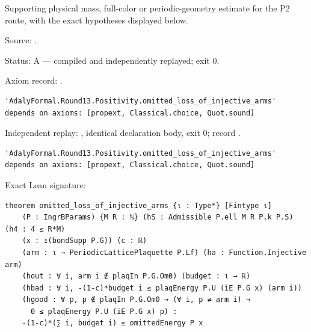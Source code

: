 \begin{theorem}[bp-469]
\label{bp-469}
\leanok
Supporting physical mass, full-color or periodic-geometry estimate for the P2 route, with the exact hypotheses displayed below.

\par Source: \texttt{}.
\par Status: A — compiled and independently replayed; exit 0.
\par Axiom record: \texttt{}.
\begin{verbatim}
'AdalyFormal.Round13.Positivity.omitted_loss_of_injective_arms' depends on axioms: [propext, Classical.choice, Quot.sound]
\end{verbatim}
\par Independent replay: \texttt{}, identical declaration body, exit 0; record \texttt{}.
\begin{verbatim}
'AdalyFormal.Round13.Positivity.omitted_loss_of_injective_arms' depends on axioms: [propext, Classical.choice, Quot.sound]
\end{verbatim}
\par Exact Lean signature:
\begin{verbatim}
theorem omitted_loss_of_injective_arms {ι : Type*} [Fintype ι]
    (P : IngrBParams) {M R : ℕ} (hS : Admissible P.ell M R P.k P.S) (h4 : 4 ≤ R*M)
    (x : ↥(bondSupp P.G)) (c : ℝ)
    (arm : ι → PeriodicLatticePlaquette P.Lf) (ha : Function.Injective arm)
    (hout : ∀ i, arm i ∉ plaqIn P.G.Om0) (budget : ι → ℝ)
    (hbad : ∀ i, -(1-c)*budget i ≤ plaqEnergy P.U (iE P.G x) (arm i))
    (hgood : ∀ p, p ∉ plaqIn P.G.Om0 → (∀ i, p ≠ arm i) →
      0 ≤ plaqEnergy P.U (iE P.G x) p) :
    -(1-c)*(∑ i, budget i) ≤ omittedEnergy P x
\end{verbatim}
\end{theorem}

